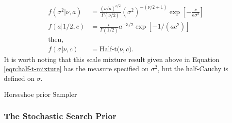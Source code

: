 \begin{align}\label{eqn:half-t-mixture}
f(\sigma^2 \vert \nu, a) & = \frac{ (\nu/a)^{\nu/2} }{ \Gamma(\nu/2) } (\sigma^{2})^{-(\nu/2 +1)}
\exp \left[- \frac{\nu}{a \sigma^2} \right] \\
f(a\vert 1/2,c) & =\frac{c}{\Gamma(1/2)}a^{-3/2}\exp\left[-1/(ac^{2})\right]  \\
\text{then,} & \\
f(\sigma \vert\nu,c) & = \text{Half-t($\nu,c$)}. 
\end{align}  
It is worth noting that this scale mixture result given above in Equation \ref{eqn:half-t-mixture} has the measure specified on $\sigma^2$, but the half-Cauchy is defined on $\sigma$. 
			
	
			\begin{algorithm}[H]
{}
\caption{Horseshoe prior Sampler}\label{psd:horseshoe_prior_sampler}
			\end{algorithm}
		
		\subsubsection{The Stochastic Search Prior}\label{sec:ssvs_app}

